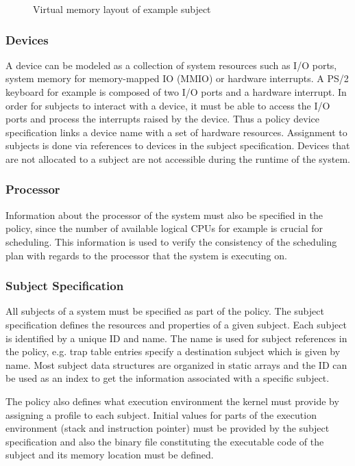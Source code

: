 \begin{figure}[h]
	\centering
	
	\caption{Virtual memory layout of example subject}
	\label{fig:virt-mem-layout-example}
\end{figure}

\subsubsection{Devices}
A device can be modeled as a collection of system resources such as I/O ports,
system memory for memory-mapped IO (MMIO) or hardware interrupts. A
PS/2 keyboard for example is composed of two I/O ports and a hardware
interrupt.  In order for subjects to interact with a device, it must be able to
access the I/O ports and process the interrupts raised by the device. Thus a
policy device specification links a device name with a set of hardware
resources. Assignment to subjects is done via references to devices in the
subject specification.  Devices that are not allocated to a subject are not
accessible during the runtime of the system.

\subsubsection{Processor}
Information about the processor of the system must also be specified in the
policy, since the number of available logical CPUs for
example is crucial for scheduling. This information is used to verify the
consistency of the scheduling plan with regards to the processor that the
system is executing on.

\subsubsection{Subject Specification}
All subjects of a system must be specified as part of the policy. The subject
specification defines the resources and properties
of a given subject. Each subject is identified by a unique ID and name. The
name is used for subject references in the policy, e.g. trap table entries
specify a destination subject which is given by name. Most subject data
structures are organized in static arrays and the ID can be used as an index to
get the information associated with a specific subject.

The policy also defines what execution environment the kernel must provide by
assigning a profile to each subject. Initial values for parts of the execution
environment (stack and instruction pointer) must be provided by the subject
specification and also the binary file constituting the executable code of the
subject and its memory location must be defined.

